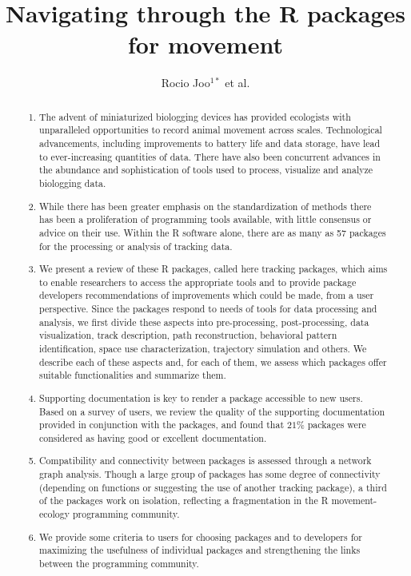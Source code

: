 \documentclass[a4paper,12pt]{article}
\title{Navigating through the R packages for movement}
\author{Rocio Joo$^{1*}$ et al.}
\begin{document}
\maketitle


\begin{abstract}                %
  \noindent \begin{enumerate}
  \item The advent of miniaturized biologging devices has provided ecologists with unparalleled opportunities to record animal movement across scales. Technological advancements, including improvements to battery life and data storage, have lead to ever-increasing quantities of data. There have also been concurrent advances in the abundance and sophistication of tools used to process, visualize and analyze biologging data.   
  \item While there has been greater emphasis on the standardization of methods there has been a proliferation of programming tools available, with little consensus or advice on their use. Within the R software alone, there are as many as 57 packages for the processing or analysis of tracking data. 
  \item We present a review of these R packages, called here tracking packages, which aims to enable researchers to access the appropriate tools and to provide package developers recommendations of improvements which could be made, from a user perspective. Since the packages respond to needs of tools for data processing and analysis, we first divide these aspects into pre-processing, post-processing, data visualization, track description, path reconstruction, behavioral pattern identification, space use characterization, trajectory simulation and others. We describe each of these aspects and, for each of them, we assess which packages offer suitable functionalities and summarize them. 
  \item Supporting documentation is key to render a package accessible to new users. Based on a survey of users, we review the quality of the supporting documentation provided in conjunction with the packages, and found that $21\%$ packages were considered as having good or excellent documentation. 
  \item Compatibility and connectivity between packages is assessed through a network graph analysis. Though a large group of packages has some degree of connectivity (depending on functions or suggesting the use of another tracking package), a third of the packages work on isolation, reflecting a fragmentation in the R movement-ecology programming community. 
  \item We provide some criteria to users for choosing packages and to developers for maximizing the usefulness of individual packages and strengthening the links between the programming community. 
  \end{enumerate}
\end{abstract}
\end{document}
